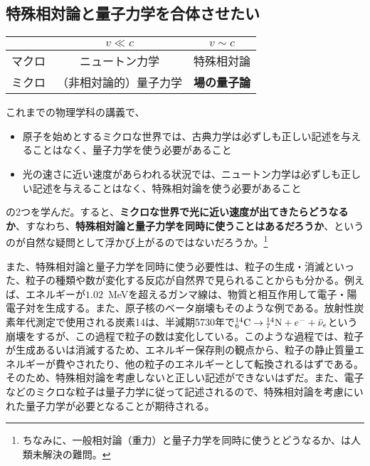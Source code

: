 \documentclass[10pt,a4paper]{jarticle}
\begin{document}
\subsection{特殊相対論と量子力学を合体させたい}
\begin{table}[h]
\centering
\begin{tabular}{c|cc}
& $v\ll c$ & $v\sim c$ \\\hline
マクロ & ニュートン力学 & 特殊相対論 \\
ミクロ & （非相対論的）量子力学 & \textbf{場の量子論}
\end{tabular}
\end{table}
これまでの物理学科の講義で、
\begin{itemize}
\item 原子を始めとするミクロな世界では、古典力学は必ずしも正しい記述を与えることはなく、量子力学を使う必要があること
\item 光の速さに近い速度があらわれる状況では、ニュートン力学は必ずしも正しい記述を与えることはなく、特殊相対論を使う必要があること
\end{itemize}
の2つを学んだ。すると、\textbf{ミクロな世界で光に近い速度が出てきたらどうなるか}、すなわち、\textbf{特殊相対論と量子力学を同時に使うことはあるだろうか}、というのが自然な疑問として浮かび上がるのではないだろうか。\footnote{ちなみに、一般相対論（重力）と量子力学を同時に使うとどうなるか、は人類未解決の難問。}

また、特殊相対論と量子力学を同時に使う必要性は、粒子の生成・消滅といった、粒子の種類や数が変化する反応が自然界で見られることからも分かる。例えば、エネルギーが$1.02$~MeVを超えるガンマ線は、物質と相互作用して電子・陽電子対を生成する。また、原子核のベータ崩壊もそのような例である。放射性炭素年代測定で使用される炭素14は、半減期5730年で${^{14}_{6}{\rm C}}\to {^{14}_{7}{\rm N}} + e^- + \bar\nu_e$という崩壊をするが、この過程で粒子の数は変化している。このような過程では、粒子が生成あるいは消滅するため、エネルギー保存則の観点から、粒子の静止質量エネルギーが費やされたり、他の粒子のエネルギーとして転換されるはずである。そのため、特殊相対論を考慮しないと正しい記述ができないはずだ。また、電子などのミクロな粒子は量子力学に従って記述されるので、特殊相対論を考慮にいれた量子力学が必要となることが期待される。
\end{document}
